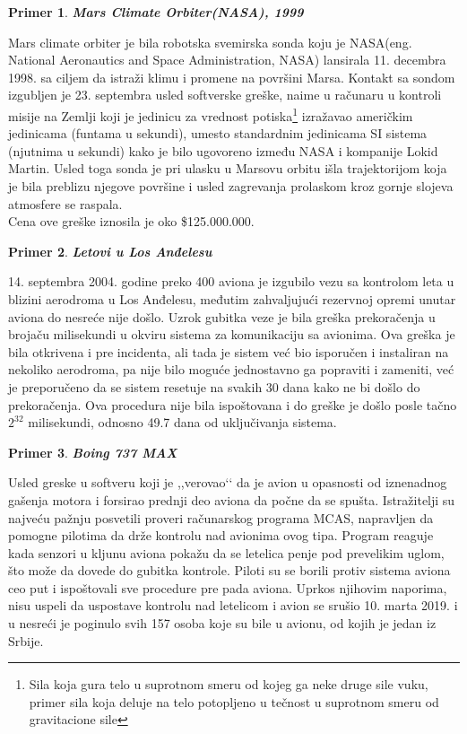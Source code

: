 \documentclass[a4paper]{article}
\newtheorem{primer}{Primer}[section]
\begin{document}
\begin{primer}
\textbf{Mars Climate Orbiter(NASA), 1999 }
\end{primer}
Mars climate orbiter je bila robotska svemirska sonda koju je NASA(eng. National Aeronautics and Space Administration,
NASA) lansirala 11. decembra 1998. sa ciljem da istraži klimu i promene na površini Marsa. Kontakt sa sondom izgubljen je 23. septembra usled softverske greške, naime u računaru u kontroli misije na Zemlji koji je jedinicu za vrednost potiska\footnote{ Sila koja gura telo u suprotnom smeru od kojeg ga neke druge sile vuku, primer sila koja deluje na telo potopljeno u tečnost u suprotnom smeru od gravitacione sile} izražavao američkim jedinicama (funtama u sekundi), umesto standardnim jedinicama SI sistema (njutnima u sekundi) kako je bilo ugovoreno između NASA i kompanije Lokid Martin. Usled toga sonda je pri ulasku u Marsovu orbitu išla trajektorijom koja je bila preblizu njegove površine i usled zagrevanja prolaskom kroz gornje slojeva atmosfere se raspala.\\
Cena ove greške iznosila je oko \$125.000.000.\\


\begin{primer}
\textbf{Letovi u Los Anđelesu}
\end{primer}
14. septembra 2004. godine preko 400 aviona je izgubilo vezu sa kontrolom leta u blizini aerodroma u Los Anđelesu, međutim zahvaljujući rezervnoj opremi unutar aviona do nesreće nije došlo. Uzrok gubitka veze je bila greška prekoračenja u brojaču milisekundi u okviru sistema za komunikaciju sa avionima. Ova greška je bila otkrivena i pre incidenta, ali tada je sistem već bio isporučen i instaliran na nekoliko aerodroma, pa nije bilo moguće jednostavno ga popraviti i zameniti, već je preporučeno da se sistem resetuje na svakih 30 dana kako ne bi došlo do prekoračenja. Ova procedura nije bila ispoštovana i do greške je došlo posle tačno $2^{32}$ milisekundi, odnosno 49.7 dana od uključivanja sistema.\\

\begin{primer}
\textbf{Boing 737 MAX}
\end{primer}
Usled greske u softveru koji je ,,verovao‘‘ da je avion u opasnosti od iznenadnog gašenja motora i forsirao prednji deo aviona da počne da se spušta. Istražitelji su najveću pažnju posvetili proveri računarskog programa MCAS, napravljen da pomogne pilotima da drže kontrolu nad avionima ovog tipa. Program reaguje kada senzori u kljunu aviona pokažu da se letelica penje pod prevelikim uglom, što može da dovede do gubitka kontrole. Piloti su se borili protiv sistema aviona ceo put i ispoštovali sve procedure pre pada aviona. Uprkos njihovim naporima, nisu uspeli da uspostave kontrolu nad letelicom i avion se srušio 10. marta 2019. i u nesreći je poginulo svih 157 osoba koje su bile u avionu, od kojih je jedan iz Srbije.\\
\end{document}
